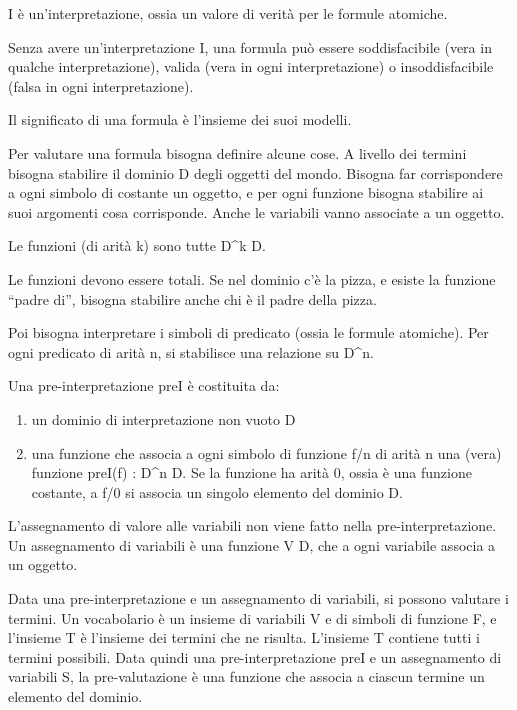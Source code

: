 I \`e un'interpretazione, ossia un valore di verit\`a per le formule atomiche.

Senza avere un'interpretazione I, una formula pu\`o essere soddisfacibile (vera in qualche interpretazione), valida (vera in ogni interpretazione) o insoddisfacibile (falsa in ogni interpretazione).

Il significato di una formula \`e l'insieme dei suoi modelli.

Per valutare una formula bisogna definire alcune cose. A livello dei termini bisogna stabilire il dominio D degli oggetti del mondo. Bisogna far corrispondere a ogni simbolo di costante un oggetto, e per ogni funzione bisogna stabilire ai suoi argomenti cosa corrisponde. Anche le variabili vanno associate a un oggetto.

Le funzioni (di arit\`a k) sono tutte D^k \to D.

Le funzioni devono essere totali. Se nel dominio c'\`e la pizza, e esiste la funzione ``padre di'', bisogna stabilire anche chi \`e il padre della pizza.

Poi bisogna interpretare i simboli di predicato (ossia le formule atomiche). Per ogni predicato di arit\`a n, si stabilisce una relazione su D^n.

\begin{defn}
Una pre-interpretazione preI \`e costituita da:
\begin{enumerate}
    \item un dominio di interpretazione non vuoto D
    \item una funzione che associa a ogni simbolo di funzione f/n di arit\`a n  una (vera) funzione preI(f) : D^n \to D. Se la funzione ha arit\`a 0, ossia \`e una funzione costante, a f/0 si associa un singolo elemento del dominio D.
\end{enumerate}
\end{defn}
L'assegnamento di valore alle variabili non viene fatto nella pre-interpretazione. Un assegnamento di variabili \`e una funzione V \to D, che a ogni variabile associa a un oggetto.

Data una pre-interpretazione e un assegnamento di variabili, si possono valutare i termini. Un vocabolario \`e un insieme di variabili V e di simboli di funzione F, e l'insieme T \`e l'insieme dei termini che ne risulta. L'insieme T contiene tutti i termini possibili. Data quindi una pre-interpretazione preI e un assegnamento di variabili S, la pre-valutazione \`e una funzione che associa a ciascun termine un elemento del dominio.

